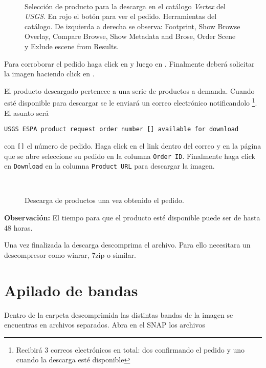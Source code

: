\begin{figure}[H]
    \centering
    \\
    \caption{Selección de producto para la descarga en el catálogo \emph{Vertex} del \emph{USGS}. En rojo el botón para ver el pedido. Herramientas del catálogo. De izquierda a derecha se observa: Footprint, Show Browse Overlay, Compare Browse, Show Metadata and Brose, Order Scene  y Exlude escene from Results.}
    \label{fig:descarga}
\end{figure}

Para corroborar el pedido haga click en  y luego en . Finalmente deberá solicitar la imagen haciendo click en .

El producto descargado pertenece a una serie de productos a demanda.  Cuando  esté disponible para descargar se le enviará un correo electrónico notificandolo \footnote{Recibirá 3 correos electrónicos en total: dos confirmando el pedido y uno cuando la descarga esté disponible}. El asunto será

\begin{center}
\texttt{USGS ESPA product request order number [] available for download}
\end{center}

con \texttt{[]} el número de pedido. Haga click en el link dentro del correo y en la página que se abre seleccione su pedido en la columna \texttt{Order ID}. Finalmente haga click en \texttt{Download} en la columna \texttt{Product URL} para descargar la imagen.

\begin{figure}[h!]
    \centering
    \\
    \caption{Descarga de productos una vez obtenido el pedido.}
    \label{fig:descarga2}
\end{figure}

\textbf{Observación:} El tiempo para que el producto esté disponible puede ser de hasta 48 horas.

Una vez finalizada la descarga descomprima el archivo. Para ello necesitara un descompresor como winrar, 7zip o similar.

\section{Apilado de bandas}
Dentro de la carpeta descomprimida las distintas bandas de la imagen se encuentras en archivos separados. Abra en el SNAP los archivos

